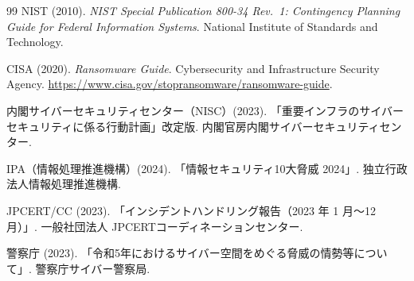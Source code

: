 \documentclass[12pt,a4paper]{article}
\theoremstyle{plain}
\theoremstyle{definition}
\theoremstyle{remark}
\begin{document}
\begin{thebibliography}{99}
NIST (2010).
\textit{NIST Special Publication 800-34 Rev.\ 1:
Contingency Planning Guide for Federal Information Systems}.
National Institute of Standards and Technology.

CISA (2020).
\textit{Ransomware Guide}.
Cybersecurity and Infrastructure Security Agency.
\url{https://www.cisa.gov/stopransomware/ransomware-guide}.

内閣サイバーセキュリティセンター（NISC）(2023).
「重要インフラのサイバーセキュリティに係る行動計画」改定版.
内閣官房内閣サイバーセキュリティセンター.

IPA（情報処理推進機構）(2024).
「情報セキュリティ10大脅威 2024」.
独立行政法人情報処理推進機構.

JPCERT/CC (2023).
「インシデントハンドリング報告（2023 年 1 月〜12 月）」.
一般社団法人 JPCERTコーディネーションセンター.

警察庁 (2023).
「令和5年におけるサイバー空間をめぐる脅威の情勢等について」.
警察庁サイバー警察局.

\end{thebibliography}
\end{document}
